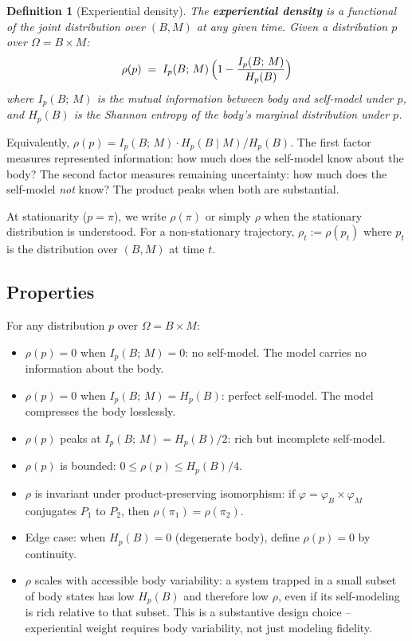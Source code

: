\documentclass[12pt]{article}
\newtheorem{definition}[theorem]{Definition}
\theoremstyle{remark}
\begin{document}
\begin{definition}[Experiential density]\label{def:rho}
The \textbf{experiential density} is a functional of the joint distribution over $(B, M)$ at any given time. Given a distribution $p$ over $\Omega = B \times M$:
\begin{equation}\label{eq:rho}
  \rho(p) \;=\; I_p(B;\,M)\,\Bigl(1 - \frac{I_p(B;\,M)}{H_p(B)}\Bigr)
\end{equation}
where $I_p(B;\,M)$ is the mutual information between body and self-model under $p$, and $H_p(B)$ is the Shannon entropy of the body's marginal distribution under $p$.
\end{definition}

Equivalently, $\rho(p) = I_p(B;\,M) \cdot H_p(B \mid M) / H_p(B)$. The first factor measures represented information: how much does the self-model know about the body? The second factor measures remaining uncertainty: how much does the self-model \emph{not} know? The product peaks when both are substantial.

At stationarity ($p = \pi$), we write $\rho(\pi)$ or simply $\rho$ when the stationary distribution is understood. For a non-stationary trajectory, $\rho_t := \rho(p_t)$ where $p_t$ is the distribution over $(B, M)$ at time $t$.

\subsection{Properties}\label{sec:rho-properties}

For any distribution $p$ over $\Omega = B \times M$:
\begin{itemize}[leftmargin=2em]
\item $\rho(p) = 0$ when $I_p(B;\,M) = 0$: no self-model. The model carries no information about the body.
\item $\rho(p) = 0$ when $I_p(B;\,M) = H_p(B)$: perfect self-model. The model compresses the body losslessly.
\item $\rho(p)$ peaks at $I_p(B;\,M) = H_p(B)/2$: rich but incomplete self-model.
\item $\rho(p)$ is bounded: $0 \leq \rho(p) \leq H_p(B)/4$.
\item $\rho$ is invariant under product-preserving isomorphism: if $\varphi = \varphi_B \times \varphi_M$ conjugates $P_1$ to $P_2$, then $\rho(\pi_1) = \rho(\pi_2)$.
\item Edge case: when $H_p(B) = 0$ (degenerate body), define $\rho(p) = 0$ by continuity.
\item $\rho$ scales with accessible body variability: a system trapped in a small subset of body states has low $H_p(B)$ and therefore low $\rho$, even if its self-modeling is rich relative to that subset. This is a substantive design choice -- experiential weight requires body variability, not just modeling fidelity.
\end{itemize}
\end{document}
